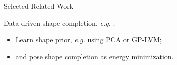 \documentclass[22pt,table]{beamer}
\makeatletter
\newcommand*{\eg}{\emph{e.g.}\@\xspace}
\makeatother
\begin{document}
  \begin{frame}
    {\large Selected Related Work}
    
    Data-driven shape completion, \eg
    \cite{DameReid:2013,EngelmannStuecklerLeibe:2016}:
    \begin{itemize}
      \item Learn shape prior, \eg using PCA or GP-LVM;
      \item and pose shape completion as energy minimization.
    \end{itemize}
    
    \hspace*{4cm}
  \end{frame}
  
\end{document}
